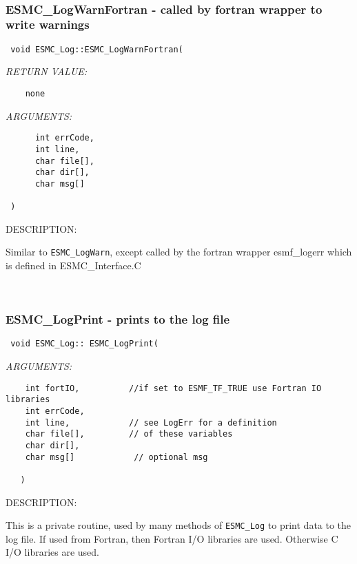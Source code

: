 \mbox{}\hrulefill\ 
 
\subsubsection [ESMC\_LogWarnFortran] {ESMC\_LogWarnFortran - called by fortran wrapper to write warnings}


  
\begin{verbatim} 
 void ESMC_Log::ESMC_LogWarnFortran(\end{verbatim}{\em RETURN VALUE:}
\begin{verbatim}    none\end{verbatim}{\em ARGUMENTS:}
\begin{verbatim} 
      int errCode,
      int line,
      char file[],
      char dir[],
      char msg[]
 
 )\end{verbatim}
{\sf DESCRIPTION:\\ }


   Similar to {\tt ESMC\_LogWarn}, except called by the fortran
   wrapper esmf\_logerr which is
   defined in ESMC\_Interface.C 
 
\mbox{}\hrulefill\ 
 

  \subsubsection [ESMC\_LogPrint] {ESMC\_LogPrint - prints to the log file}


   
\begin{verbatim} 
 void ESMC_Log:: ESMC_LogPrint(
 \end{verbatim}{\em ARGUMENTS:}
\begin{verbatim} 
    int fortIO,          //if set to ESMF_TF_TRUE use Fortran IO libraries
    int errCode,
    int line,            // see LogErr for a definition
    char file[],         // of these variables
    char dir[],           
    char msg[]            // optional msg
 
   )
 \end{verbatim}
{\sf DESCRIPTION:\\ }

This is a private routine, used by many methods of 
   {\tt ESMC\_Log} to print data to the log file. If used from Fortran, then
   Fortran I/O libraries are used.  Otherwise C I/O libraries are used. 
 
